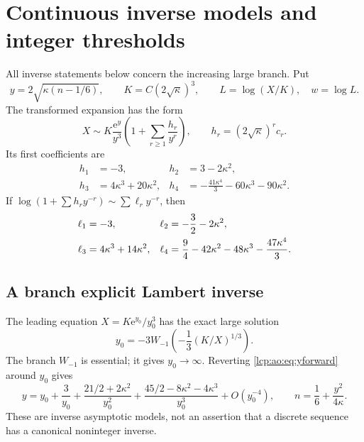 \documentclass[11pt]{article}
\numberwithin{equation}{section}
\theoremstyle{definition}\newtheorem{definition}[theorem]{Definition}
\theoremstyle{remark}\newtheorem{remark}[theorem]{Remark}
\newcommand{\ee}{\mathrm e}
\begin{document}
\section{Continuous inverse models and integer thresholds}\label{lcp:ao:sec:inverse}
All inverse statements below concern the increasing large branch. Put
\begin{equation}\label{lcp:ao:eq:inversevars}
 y=2\sqrt{\kappa(n-1/6)},\qquad K=C(2\sqrt\kappa)^3,\qquad
 L=\log(X/K),\quad w=\log L.
\end{equation}
The transformed expansion has the form
\begin{equation}\label{lcp:ao:eq:yforward}
 X\sim K\frac{\ee^y}{y^3}\left(1+\sum_{r\ge1}\frac{h_r}{y^r}\right),
 \qquad h_r=(2\sqrt\kappa)^rc_r.
\end{equation}
Its first coefficients are
\begin{align*}
h_1&=-3,&h_2&=3-2\kappa^2,\\
h_3&=4\kappa^3+20\kappa^2,&
h_4&=-\frac{41\kappa^4}{3}-60\kappa^3-90\kappa^2.
\end{align*}
If $\log(1+\sum h_r y^{-r})\sim\sum\ell_r y^{-r}$, then
\begin{align}\label{lcp:ao:eq:ell}
\ell_1&=-3,&\ell_2&=-\frac32-2\kappa^2,\notag\\
\ell_3&=4\kappa^3+14\kappa^2,&
\ell_4&=\frac94-42\kappa^2-48\kappa^3-\frac{47\kappa^4}{3}.
\end{align}

\subsection{A branch explicit Lambert inverse}
The leading equation $X=K\ee^{y_0}/y_0^3$ has the exact large solution
\begin{equation}\label{lcp:ao:eq:W}
 y_0=-3W_{-1}\!\left(-\frac13(K/X)^{1/3}\right).
\end{equation}
The branch $W_{-1}$ is essential; it gives $y_0\to\infty$. Reverting \eqref{lcp:ao:eq:yforward} around $y_0$ gives
\begin{equation}\label{lcp:ao:eq:Winverse}
 y=y_0+\frac3{y_0}+\frac{21/2+2\kappa^2}{y_0^2}
 +\frac{45/2-8\kappa^2-4\kappa^3}{y_0^3}+O(y_0^{-4}),
 \qquad n=\frac16+\frac{y^2}{4\kappa}.
\end{equation}
These are inverse asymptotic models, not an assertion that a discrete sequence has a canonical noninteger inverse.
\end{document}
